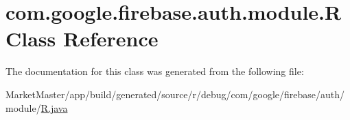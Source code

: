 \hypertarget{classcom_1_1google_1_1firebase_1_1auth_1_1module_1_1R}{}\section{com.\+google.\+firebase.\+auth.\+module.\+R Class Reference}
\label{classcom_1_1google_1_1firebase_1_1auth_1_1module_1_1R}


The documentation for this class was generated from the following file\+:\begin{DoxyCompactItemize}
\item 
Market\+Master/app/build/generated/source/r/debug/com/google/firebase/auth/module/\mbox{\hyperlink{debug_2com_2google_2firebase_2auth_2module_2R_8java}{R.\+java}}\end{DoxyCompactItemize}
